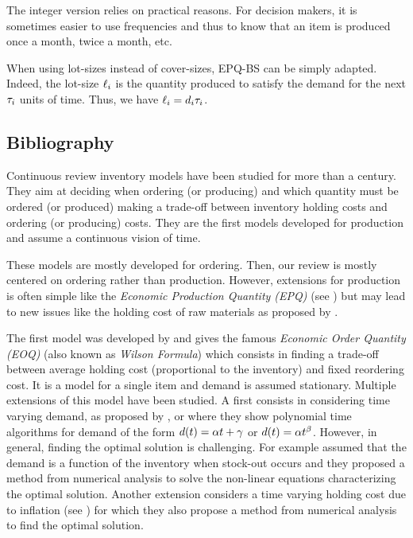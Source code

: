 The integer version relies on practical reasons.
For decision makers, it is sometimes easier to use frequencies and thus to know that an item is produced once a month, twice a month, etc.


When using lot-sizes instead of cover-sizes, EPQ-BS can be simply adapted.
Indeed, the lot-size $\ell_i$ is the quantity produced to satisfy the demand for the next $\tau_i$ units of time.
Thus, we have $\ell_i=d_i\tau_i$.


\subsection{Bibliography}
\label{sec:lot-size:single-line:deterministic:bibliography}


Continuous review inventory models have been studied for more than a century.
They aim at deciding when ordering (or producing) and which quantity must be ordered (or produced) making a trade-off between inventory holding costs and ordering (or producing) costs.
They are the first models developed for production and assume a continuous vision of time.


These models are mostly developed for ordering.
Then, our review is mostly centered on ordering rather than production. 
However, extensions for production is often simple like the \emph{Economic Production Quantity (EPQ)} (see \citet{Taft1918}) but may lead to new issues like the holding cost of raw materials as proposed by \citet{Lin2013}.


The first model was developed by \citet{Harris1913} and gives the famous \emph{Economic Order Quantity (EOQ)} (also known as \emph{Wilson Formula}) which consists in finding a trade-off between average holding cost (proportional to the inventory) and fixed reordering cost.
It is a model for a single item and demand is assumed stationary.
Multiple extensions of this model have been studied.
A first consists in considering time varying demand, as proposed by \citet{Resh1976}, \citet{Donaldson1977} or \citet{Barbosa1978} where they show polynomial time algorithms for demand of the form $d(t)=\alpha t+\gamma$ or $d(t)=\alpha t^{\beta}$.
However, in general, finding the optimal solution is challenging.
For example \citet{Padmanabhan1990} assumed that the demand is a function of the inventory when stock-out occurs and they proposed a method from numerical analysis to solve the non-linear equations characterizing the optimal solution.
Another extension considers a time varying holding cost due to inflation (see \citet{Vrat1990}) for which they also propose a method from numerical analysis to find the optimal solution.


